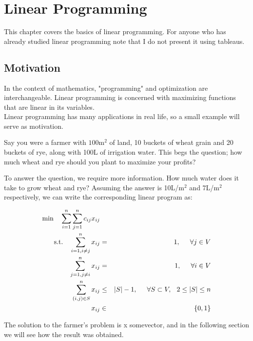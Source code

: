 \section{Linear Programming}

This chapter covers the basics of linear programming. For anyone who has already
studied linear programming note that I do not present it using tableaus.

\subsection{Motivation}

In the context of mathematics, "programming" and optimization are interchangeable.
Linear programming is concerned with maximizing functions that are linear in its
variables.\\

Linear programming has many applications in real life, so a small example will
serve as motivation.

Say you were a farmer with $100 \text{m}^2$ of land, 10 buckets of wheat grain
and 20 buckets of rye, along with 100L of irrigation water. This begs the question;
how much wheat and rye should you plant to maximize your profits?

To answer the question, we require more information. How much water does it take
to grow wheat and rye? Assuming the answer is 10L/m$^2$ and 7L/m$^2$  respectively, we can
write the corresponding linear program as:

\begin{align}
\label{twoindex}
\textrm{min}\quad  \sum_{i=1}^n \sum_{j=1}^n c_{ij}x_{ij} & & \\
\textrm{s.t.}\quad \sum_{i=1, i\neq j}^n x_{ij} & =& 1,\hspace{0.5cm}\forall j\in V \label{twoindexarrive}\\
\quad \sum_{j=1, j\neq i}^n x_{ij} & =& 1, \hspace{0.5cm} \forall i\in V \label{twoindexleave}\\
\quad \sum_{(i,j) \in S}^n x_{ij} & \leq& |S| - 1, \hspace{0.5cm} \forall S\subset V, \hspace{0.25cm} 2\leq |S| \leq n \label{twoindexsec}\\
x_{ij}& \in & \{ 0, 1\} 
\end{align}

The solution to the farmer's problem is x somevector, and in the following section we
will see how the result was obtained. 

